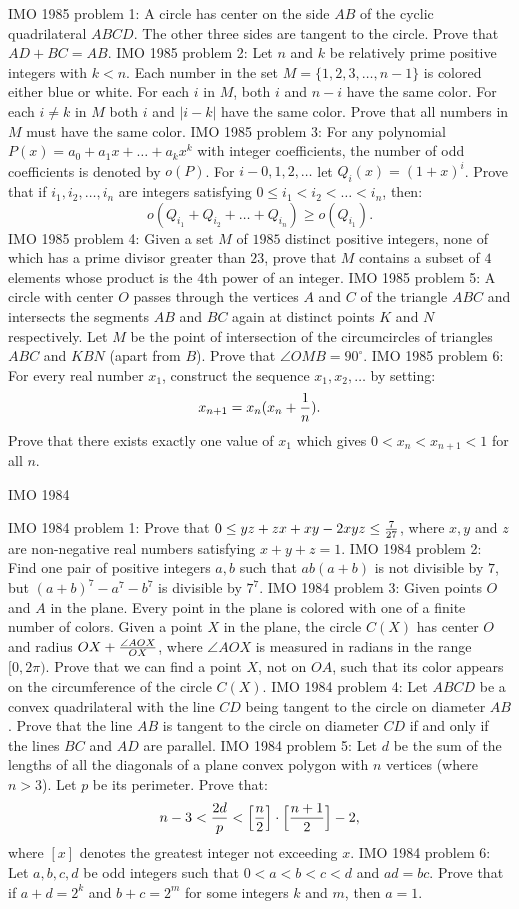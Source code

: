 IMO 1985 problem 1:  A circle has center on the side $AB$ of the cyclic quadrilateral $ABCD$. The other three sides are tangent to the circle. Prove that $AD+BC=AB$. 
IMO 1985 problem 2:  Let $n$ and $k$ be relatively prime positive integers with $k<n$. Each number in the set $M=\{1,2,3,\ldots,n-1\}$ is colored either blue or white. For each $i$ in $M$, both $i$ and $n-i$ have the same color. For each $i\ne k$ in $M$ both $i$ and $|i-k|$ have the same color. Prove that all numbers in $M$ must have the same color. 
IMO 1985 problem 3:  For any polynomial $P(x)=a_0+a_1x+\ldots+a_kx^k$ with integer coefficients, the number of odd coefficients is denoted by $o(P)$. For $i-0,1,2,\ldots$ let $Q_i(x)=(1+x)^i$. Prove that if $i_1,i_2,\ldots,i_n$ are integers satisfying $0\le i_1<i_2<\ldots<i_n$, then:
\[ o(Q_{i_1}+Q_{i_2}+\ldots+Q_{i_n})\ge o(Q_{i_1}). \] 
IMO 1985 problem 4:  Given a set $M$ of $1985$ distinct positive integers, none of which has a prime divisor greater than $23$, prove that $M$ contains a subset of $4$ elements whose product is the $4$th power of an integer. 
IMO 1985 problem 5:  A circle with center $O$ passes through the vertices $A$ and $C$ of the triangle $ABC$ and intersects the segments $AB$ and $BC$ again at distinct points $K$ and $N$ respectively. Let $M$ be the point of intersection of the circumcircles of triangles $ABC$ and $KBN$ (apart from $B$). Prove that $\angle OMB=90^{\circ}$. 
IMO 1985 problem 6:  For every real number $x_1$, construct the sequence $x_1,x_2,\ldots$ by setting:
\[ x_{n+1}=x_n(x_n+{1\over n}). \]
Prove that there exists exactly one value of $x_1$ which gives $0<x_n<x_{n+1}<1$ for all $n$. 

IMO 1984 

IMO 1984 problem 1:  Prove that $0\le yz+zx+xy-2xyz\le{7\over27}$, where $x,y$ and $z$ are non-negative real numbers satisfying $x+y+z=1$. 
IMO 1984 problem 2:  Find one pair of positive integers $a,b$ such that $ab(a+b)$ is not divisible by $7$, but $(a+b)^7-a^7-b^7$ is divisible by $7^7$. 
IMO 1984 problem 3:  Given points $O$ and $A$ in the plane. Every point in the plane is colored with one of a finite number of colors. Given a point $X$ in the plane, the circle $C(X)$ has center $O$ and radius $OX+{\angle AOX\over OX}$, where $\angle AOX$ is measured in radians in the range $[0,2\pi)$. Prove that we can find a point $X$, not on $OA$, such that its color appears on the circumference of the circle $C(X)$. 
IMO 1984 problem 4:  Let $ABCD$ be a convex quadrilateral with the line $CD$ being tangent to the circle on diameter $AB$. Prove that the line $AB$ is tangent to the circle on diameter $CD$ if and only if the lines $BC$ and $AD$ are parallel. 
IMO 1984 problem 5:  Let $ d$ be the sum of the lengths of all the diagonals of a plane convex polygon with $ n$ vertices (where $ n>3$). Let $ p$ be its perimeter. Prove that:
\[ n-3<{2d\over p}<\Bigl[{n\over2}\Bigr]\cdot\Bigl[{n+1\over 2}\Bigr]-2, \]
where $ [x]$ denotes the greatest integer not exceeding $ x$. 
IMO 1984 problem 6:  Let $a,b,c,d$ be odd integers such that $0<a<b<c<d$ and $ad=bc$. Prove that if $a+d=2^k$ and $b+c=2^m$ for some integers $k$ and $m$, then $a=1$. 

